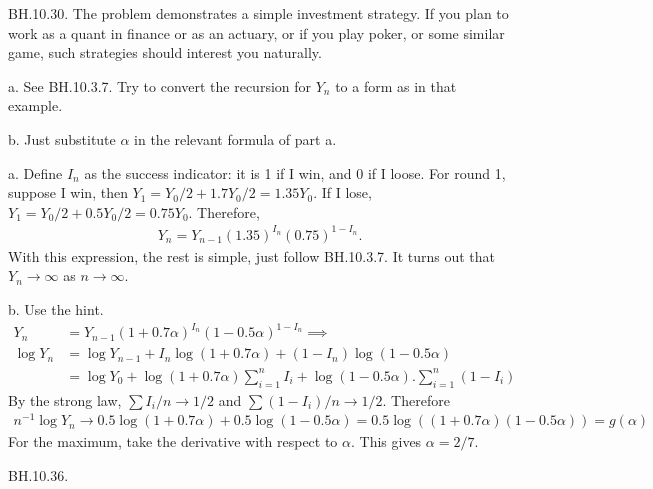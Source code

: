 \begin{exercise}
BH.10.30. The problem demonstrates a simple investment strategy.
If you plan to work as a quant in finance or as an actuary, or if you play poker, or some similar game, such strategies should interest you naturally.

\begin{hint}
a. See BH.10.3.7. Try to convert the recursion for $Y_n$ to a form as in that example.

b. Just substitute $\alpha$ in the relevant formula of part a.
\end{hint}
\begin{solution}
a. Define $I_n$ as the success indicator: it is 1 if I win, and 0 if I loose.  For round 1, suppose I win, then $Y_{1} = Y_0/2 + 1.7 Y_0/2= 1.35 Y_{0}$. If I lose,
$Y_{1} = Y_0/2 + 0.5 Y_0/2= 0.75 Y_{0}$. Therefore,
\begin{align*}
Y_n = Y_{n-1} (1.35)^{I_{n}}(0.75)^{1-I_{n}}.
\end{align*}
With this expression, the rest  is simple, just  follow  BH.10.3.7.
It turns out that $Y_n\to\infty$ as $n\to\infty$.

b. Use the hint.
\begin{align*}
Y_n &= Y_{n-1} (1+0.7\alpha)^{I_{n}}(1-0.5\alpha)^{1-I_{n}} \implies \\
\log Y_n &= \log Y_{n-1}  + I_{n} \log(1+0.7\alpha) + (1-I_{n})\log (1-0.5\alpha)  \\
& = \log Y_{0}  + \log(1+0.7\alpha) \sum_{i=1}^{n}I_{i}  + \log(1-0.5\alpha).\sum_{i=1}^{n} (1-I_{i})
\end{align*}
By the strong law, $\sum I_i/n \to 1/2$ and $\sum (1-I_{i})/n \to 1/2$. Therefore
\begin{align*}
n^{-1}\log Y_n \to 0.5 \log(1+0.7\alpha) + 0.5\log(1-0.5\alpha) = 0.5 \log( (1+0.7\alpha)(1-0.5\alpha)) = g(\alpha)
\end{align*}
For the maximum, take the derivative with respect to $\alpha$. This gives $\alpha=2/7$.
\end{solution}
\end{exercise}

\begin{exercise}
BH.10.36.
\end{exercise}


